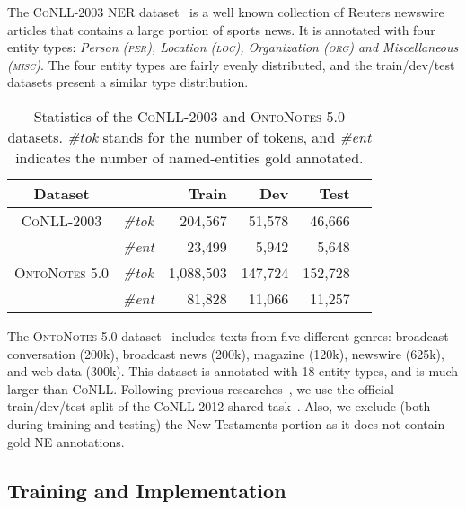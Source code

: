 \documentclass[11pt]{article}
\newcommand{\conll}{\textsc{CoNLL}}
\newcommand{\onto}{\textsc{OntoNotes}}
\newcommand{\per}{\textsc{per}}
\newcommand{\loc}{\textsc{loc}}
\newcommand{\org}{\textsc{org}}
\newcommand{\misc}{\textsc{misc}}
\begin{document}
	
	
	The \conll{-2003} NER  dataset~\cite{tjong2003introduction} is a well known collection of Reuters newswire articles that contains a large portion of sports news. It is annotated with four entity types: \textit{Person (\per), Location (\loc), Organization (\org) and Miscellaneous (\misc)}. The four entity types are fairly evenly distributed, and the train/dev/test datasets present a similar type distribution. 
	
	\begin{table}[h]
		\begin{center} 
			
			\setlength\tabcolsep{5pt} 
			
			\begin{tabular}{clrrrl}
				
				\textbf{Dataset} && \textbf{Train} & \textbf{Dev} & \textbf{Test}\\
				\hline
				\conll{-2003} & \textit{\#tok} & 204,567 & 51,578 & 46,666 \\
				& \textit{\#ent} & 23,499 & 5,942 & 5,648\\ 
				\hline
				\onto{ 5.0} & \textit{\#tok} & 1,088,503 & 147,724 & 152,728 \\
				& \textit{\#ent} &  81,828 & 11,066 & 11,257 \\	 
				\hline
			\end{tabular} 
		\end{center}
		
		\caption{Statistics of the \conll{-2003} and \onto{ 5.0} datasets. \textit{\#tok} stands for the number of tokens, and \textit{\#ent} indicates the number of named-entities gold annotated. }
		\label{tab.dataset} 
		
	\end{table}
	
	The \onto{ 5.0}  dataset~\cite{hovy2006ontonotes,pradhan2013towards}  includes texts from five different genres: broadcast conversation (200k), broadcast news (200k), magazine (120k), newswire (625k), and web data (300k). This dataset is annotated with 18 entity types, and is much larger than \conll. Following previous researches~\cite{chiu2015named,strubell2017fast}, we use the official train/dev/test split of the CoNLL-2012 shared task~\cite{pradhan_conll-2012_2012}.  Also, we exclude (both during training and testing) the New Testaments portion as it does not contain gold NE annotations.
	
	
	
	\subsection{Training and Implementation}
	
\end{document}
